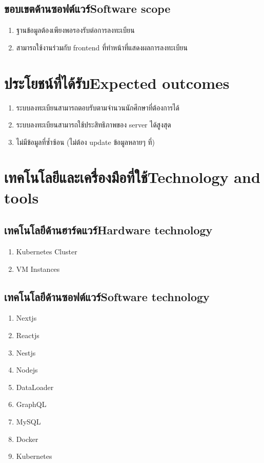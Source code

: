 \subsection{\ifcpe ขอบเขตด้านซอฟต์แวร์\else Software scope\fi}
\begin{enumerate}
    \item ฐานข้อมูลต้องเพียงพอรองรับต่อการลงทะเบียน
    \item สามารถใช้งานร่วมกับ frontend ที่ทำหน้าที่แสดงผลการลงทะเบียน
\end{enumerate}
\section{\ifcpe ประโยชน์ที่ได้รับ\else Expected outcomes\fi}
\begin{enumerate}
    \item ระบบลงทะเบียนสามารถตอบรับตามจำนวนนักศึกษาที่ต้องการได้
    \item ระบบลงทะเบียนสามารถใช้ประสิทธิภาพของ server ได้สูงสุด
    \item ไม่มีข้อมูลที่ซ้ำซ้อน (ไม่ต้อง update ข้อมูลหลายๆ ที่)
\end{enumerate}

\section{\ifcpe เทคโนโลยีและเครื่องมือที่ใช้\else Technology and tools\fi}

\subsection{\ifcpe เทคโนโลยีด้านฮาร์ดแวร์\else Hardware technology\fi}
\begin{enumerate}
    \item Kubernetes Cluster
    \item VM Instances
\end{enumerate}

\subsection{\ifcpe เทคโนโลยีด้านซอฟต์แวร์\else Software technology\fi}
\begin{enumerate}
    \item Nextjs \cite{nextjs}
    \item Reactjs \cite{reactjs}
    \item Nestjs \cite {nestjs}
    \item Nodejs \cite {nodejs}
    \item DataLoader \cite {dataloader}
    \item GraphQL \cite {graphql}
    \item MySQL \cite {mysql}
    \item Docker \cite {docker}
    \item Kubernetes \cite {kubernetes}
\end{enumerate}

